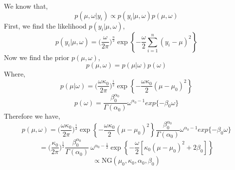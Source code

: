 \documentclass[twoside]{article}
\begin{document}
We know that,
$$ p(\mu, \omega|y_i) \propto p(y_i|\mu, \omega) p(\mu, \omega) $$
First, we find the likelihood $ p(y_i|\mu, \omega)$,
$$  p(y_i|\mu, \omega) = \bigg(\frac{\omega}{ 2 \pi} \bigg)^{\frac{n}{2}} \exp\left\{ -\frac{\omega}{2} \sum_{i=1}^{n} (y_i - \mu)^2 
\right\}  
$$
Now we find the prior $p(\mu, \omega)$,
$$p(\mu, \omega) = p(\mu | \omega) p(\omega)  $$
Where,
$$ p(\mu | \omega) = \bigg(\frac{\omega \kappa_0}{ 2 \pi} \bigg)^{\frac{1}{2}} \exp\left\{ -\frac{\omega \kappa_0}{2} (\mu - \mu_0)^2 \right\}  $$
$$p(\omega) = \frac{\beta_0^{\alpha_0}}{\Gamma (\alpha_0) }\omega^{\alpha_0-1} exp\{-\beta_0 \omega\}$$
Therefore we have,
$$p(\mu, \omega) = 
\bigg(\frac{\omega \kappa_0}{ 2 \pi} \bigg)^{\frac{1}{2}} \exp\left\{ -\frac{\omega \kappa_0}{2} (\mu - \mu_0)^2 \right\} 
\frac{\beta_0^{\alpha_0}}{\Gamma (\alpha_0) }\omega^{\alpha_0-1} exp\{-\beta_0 \omega\}$$
$$
= \bigg(\frac{\kappa_0}{ 2 \pi} \bigg)^{\frac{1}{2}} \frac{\beta_0^{\alpha_0}}{\Gamma (\alpha_0) }\
 \omega^{\alpha_0-\frac{1}{2}} 
\exp\left\{ -\frac{\omega }{2} [\kappa_0(\mu - \mu_0)^2 + 2\beta_0] \right\} 
$$
$$\propto \mbox{NG}(\mu_0, \kappa_0, \alpha_0, \beta_0)$$
\end{document}
